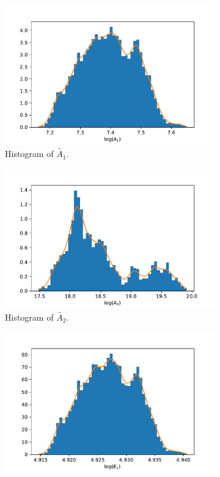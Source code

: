\begin{figure}[h!]
\centering
\begin{subfigure}{0.5\textwidth}
\centering
\includegraphics[width=\linewidth]{figures/bayesian/2_reactions/mass/hist_A1.pdf}
\caption{Histogram of $\tilde{A_1}$.}
\label{HistA1}
\end{subfigure}%
\begin{subfigure}{0.5\textwidth}
\centering
\includegraphics[width=\linewidth]{figures/bayesian/2_reactions/mass/hist_A2.pdf}
\caption{Histogram of $\tilde{A_2}$.}
\label{HistA2}
\end{subfigure}
\newline
\begin{subfigure}{0.5\textwidth}
\centering
\includegraphics[width=\linewidth]{figures/bayesian/2_reactions/mass/hist_E1.pdf}

\end{subfigure}
\end{figure}
